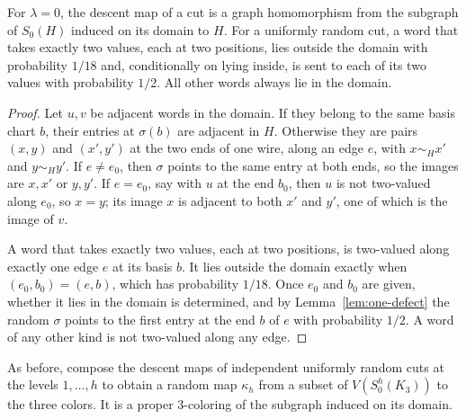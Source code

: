 \begin{lemma}\label{lem:zero-reading}
For $\lambda=0$, the descent map of a cut is a graph homomorphism from the subgraph of $S_0(H)$ induced on its domain to $H$. For a uniformly random cut, a word that takes exactly two values, each at two positions, lies outside the domain with probability $1/18$ and, conditionally on lying inside, is sent to each of its two values with probability $1/2$. All other words always lie in the domain.
\end{lemma}
\begin{proof}
Let $u,v$ be adjacent words in the domain. If they belong to the same basis chart $b$, their entries at $\sigma(b)$ are adjacent in $H$. Otherwise they are pairs $(x,y)$ and $(x',y')$ at the two ends of one wire, along an edge $e$, with $x\sim_Hx'$ and $y\sim_Hy'$. If $e\ne e_0$, then $\sigma$ points to the same entry at both ends, so the images are $x,x'$ or $y,y'$. If $e=e_0$, say with $u$ at the end $b_0$, then $u$ is not two-valued along $e_0$, so $x=y$; its image $x$ is adjacent to both $x'$ and $y'$, one of which is the image of $v$.

A word that takes exactly two values, each at two positions, is two-valued along exactly one edge $e$ at its basis $b$. It lies outside the domain exactly when $(e_0,b_0)=(e,b)$, which has probability $1/18$. Once $e_0$ and $b_0$ are given, whether it lies in the domain is determined, and by Lemma~\ref{lem:one-defect} the random $\sigma$ points to the first entry at the end $b$ of $e$ with probability $1/2$. A word of any other kind is not two-valued along any edge.
\end{proof}

As before, compose the descent maps of independent uniformly random cuts at the levels $1,\ldots,h$ to obtain a random map $\kappa_h$ from a subset of $V(S^h_0(K_3))$ to the three colors. It is a proper $3$-coloring of the subgraph induced on its domain.

